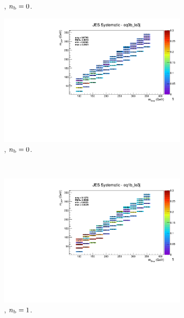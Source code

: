 \begin{figure}[ht!]
\begin{subfigure}[b]{0.32\textwidth}
    \caption{\njlow, $n_{\text{b}} = 0$.}
  \end{subfigure}
  \begin{subfigure}[b]{0.32\textwidth}
    \includegraphics[width=\textwidth, page=1]{Figs/sms/t2cc/v37/systs/T2cc_JES_eq0b_le3j.pdf}
    \caption{\njlow, $n_{\text{b}} = 0$.}
    \label{fig:sms-jes-t2cc-le3j-0b}
  \end{subfigure}\\
  \begin{subfigure}[b]{0.32\textwidth}
    \includegraphics[width=\textwidth, page=12]{Figs/sms/t2cc/v37/systs/T2cc_JES_eq1b_le3j.pdf}
    \caption{\njlow, $n_{\text{b}} = 1$.}
  \end{subfigure}
  \begin{subfigure}[b]{0.32\textwidth}

\end{subfigure}
\end{figure}
